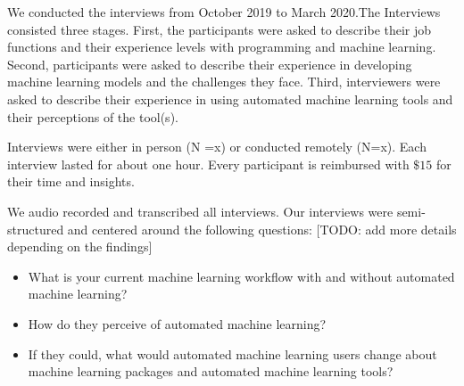 We conducted the interviews from October 2019 to March 2020.The Interviews consisted three stages. First, the participants were asked to describe their job functions and their experience levels with programming and machine learning.
Second, participants were asked to describe their experience in developing machine learning models and the challenges they face. Third, interviewers were asked to describe their experience in using automated machine learning tools and their perceptions of the tool(s). 

Interviews were either in person (N =x) or conducted remotely (N=x). Each interview lasted for about one hour. Every participant is reimbursed with $\$15$ for their time and insights.

We audio recorded and transcribed all interviews. Our interviews were semi-structured and centered around the following questions: [TODO: add more details depending on the findings]
\begin{itemize}
\item What is your current machine learning workflow with and without automated machine learning?
\item How do they perceive of automated machine learning?
\item If they could, what would automated machine learning users change about machine learning packages and automated machine learning tools?
\end{itemize}








